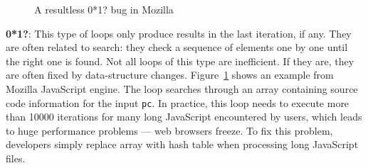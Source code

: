 \begin{figure}
\caption{A resultless 0*1? bug in Mozilla}
\label{fig:Mozilla347306}
\end{figure}



{\textbf{0*1?}}:
This type of loops only produce results in the last iteration, if any. 
They are often related to search: they check a sequence of elements one
by one until the right one is found.
Not all loops of this type are inefficient. If they are, they are often
fixed by data-structure changes.
Figure~\ref{fig:Mozilla347306} shows an example from Mozilla
JavaScript engine. 
The loop searches through an array containing source code information for the input \texttt{pc}. 
In practice, this loop needs to execute more than 10000 iterations for 
many long JavaScript encountered by users, which leads to huge 
performance problems --- web browsers freeze. To fix this problem, 
developers simply replace array with hash table when processing long
JavaScript files.


